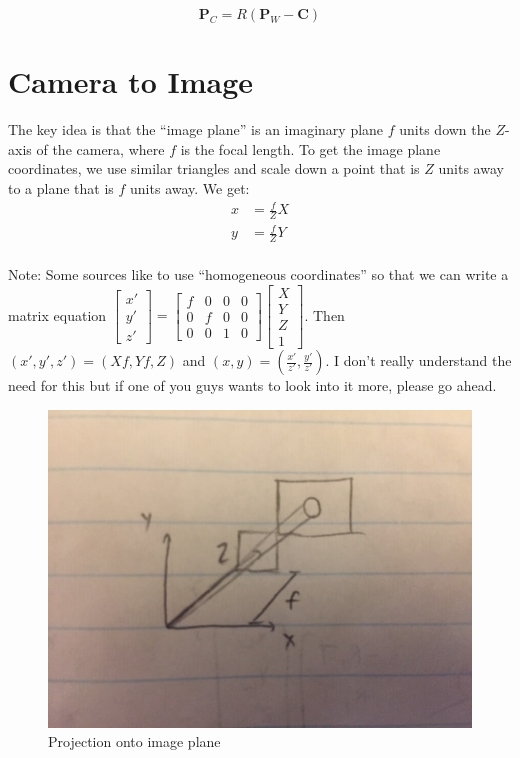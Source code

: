 \documentclass{article}
\begin{document}
\[ \bm{P}_{C}=R(\bm{P}_{W}-\bm{C}) \]

\section{Camera to Image}
The key idea is that the ``image plane'' is an imaginary plane $f$ units down the $Z$-axis of the camera, where $f$ is the focal length. To get the image plane coordinates, we use similar triangles and scale down a point that is $Z$ units away to a plane that is $f$ units away. We get:
\begin{align*}
x&=\frac{f}{Z}X \\
y&=\frac{f}{Z}Y \\
\end{align*}

Note: Some sources like to use ``homogeneous coordinates'' so that we can write a matrix equation $\begin{bmatrix} x' \\ y' \\ z' \end{bmatrix}=\begin{bmatrix} f & 0 & 0 & 0 \\ 0 & f & 0 & 0 \\ 0 & 0 & 1 & 0 \end{bmatrix}\begin{bmatrix} X \\ Y \\ Z \\ 1 \end{bmatrix}$. Then $(x', y', z')=(Xf, Yf, Z)$ and $(x, y)=(\frac{x'}{z'}, \frac{y'}{z'})$. I don't really understand the need for this but if one of you guys wants to look into it more, please go ahead. \\

\begin{figure}[H]
\includegraphics[scale=0.6]{Image_Plane}
\centering
\caption{Projection onto image plane}
\end{figure}
\end{document}
